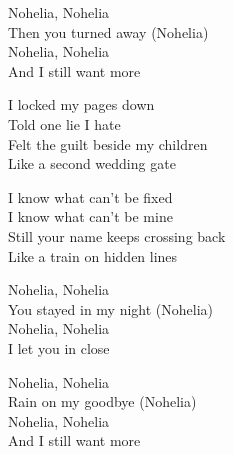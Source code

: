 \begin{lyrics}
Nohelia, Nohelia\\
Then you turned away (Nohelia)\\
Nohelia, Nohelia\\
And I still want more

I locked my pages down\\
Told one lie I hate\\
Felt the guilt beside my children\\
Like a second wedding gate

I know what can’t be fixed\\
I know what can’t be mine\\
Still your name keeps crossing back\\
Like a train on hidden lines

Nohelia, Nohelia\\
You stayed in my night (Nohelia)\\
Nohelia, Nohelia\\
I let you in close

Nohelia, Nohelia\\
Rain on my goodbye (Nohelia)\\
Nohelia, Nohelia\\
And I still want more
\end{lyrics}

